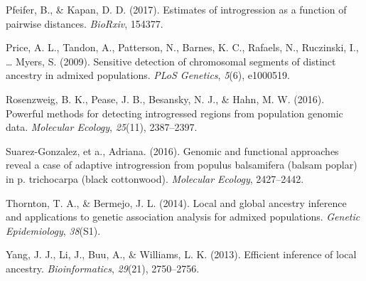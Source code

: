 \documentclass[12pt,twoside]{reedthesis}
\theoremstyle{definition}
\theoremstyle{definition}
\theoremstyle{remark}
\begin{document}
  \hypertarget{ref-pfeifer2017estimates}{}
  Pfeifer, B., \& Kapan, D. D. (2017). Estimates of introgression as a
  function of pairwise distances. \emph{BioRxiv}, 154377.
  
  \hypertarget{ref-price2009sensitive}{}
  Price, A. L., Tandon, A., Patterson, N., Barnes, K. C., Rafaels, N.,
  Ruczinski, I., \ldots{} Myers, S. (2009). Sensitive detection of
  chromosomal segments of distinct ancestry in admixed populations.
  \emph{PLoS Genetics}, \emph{5}(6), e1000519.
  
  \hypertarget{ref-rosenzweig2016powerful}{}
  Rosenzweig, B. K., Pease, J. B., Besansky, N. J., \& Hahn, M. W. (2016).
  Powerful methods for detecting introgressed regions from population
  genomic data. \emph{Molecular Ecology}, \emph{25}(11), 2387--2397.
  
  \hypertarget{ref-suarez2016}{}
  Suarez-Gonzalez, et a., Adriana. (2016). Genomic and functional
  approaches reveal a case of adaptive introgression from populus
  balsamifera (balsam poplar) in p. trichocarpa (black cottonwood).
  \emph{Molecular Ecology}, 2427--2442.
  
  \hypertarget{ref-thornton2014local}{}
  Thornton, T. A., \& Bermejo, J. L. (2014). Local and global ancestry
  inference and applications to genetic association analysis for admixed
  populations. \emph{Genetic Epidemiology}, \emph{38}(S1).
  
  \hypertarget{ref-yang2013efficient}{}
  Yang, J. J., Li, J., Buu, A., \& Williams, L. K. (2013). Efficient
  inference of local ancestry. \emph{Bioinformatics}, \emph{29}(21),
  2750--2756.


\end{document}
